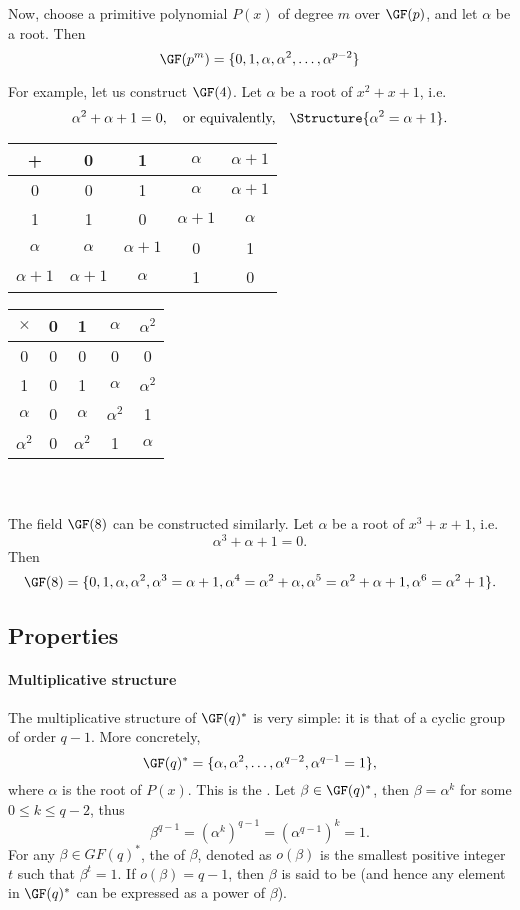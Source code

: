 \documentclass[a4paper, 11pt, openany]{book}
\begin{document}
Now, choose a primitive polynomial $P(x)$ of degree $m$ over $\GF(p)$, and let $\alpha$ be a root. Then
\[
    \GF(p^m) = \{ 0, 1, \alpha, \alpha^2, \dots, \alpha^{p-2} \}
\]



For example, let us construct $\GF(4)$. Let $\alpha$ be a root of $x^2 + x + 1$, i.e.
\[
	\alpha^2 + \alpha + 1 = 0, \quad \mbox{or equivalently,} \quad \Structure{\alpha^2 = \alpha+1}.
\]


\begin{tabular}{c|c|c|c|c|}
	+ & 0 & 1 & $\alpha$ & $\alpha+1$\\
	\hline
	0 & 0 & 1 & $\alpha$ & $\alpha+1$\\
	\hline
	1 & 1 & 0 & $\alpha+1$ & $\alpha$\\
	\hline
	$\alpha$ & $\alpha$ & $\alpha+1$ & 0 & 1\\
	\hline
	$\alpha+1$ & $\alpha+1$ & $\alpha$ & 1 & 0\\
	\hline
\end{tabular}
\hfill
\begin{tabular}{c|c|c|c|c|}
	$\times$ & 0 & 1 & $\alpha$ & $\alpha^2$\\
	\hline
	0 & 0 & 0 & 0 & 0\\
	\hline
	1 & 0 & 1 & $\alpha$ & $\alpha^2$\\
	\hline
	$\alpha$ & 0 & $\alpha$ & $\alpha^2$ & 1\\
	\hline
	$\alpha^2$ & 0 & $\alpha^2$ & 1 & $\alpha$\\
	\hline
\end{tabular}
~\\
~\\
The field $\GF(8)$ can be constructed similarly. Let $\alpha$ be a root of $x^3 + x + 1$, i.e.
\[
	\alpha^3 + \alpha + 1 = 0.
\]
Then
\[
    \GF(8) = \{0,1,\alpha,\alpha^2,\alpha^3  = \alpha+1, \alpha^4 = \alpha^2 + \alpha, \alpha^5 = \alpha^2 + \alpha + 1, \alpha^6 = \alpha^2 + 1\}.
\]


\subsection{Properties}

\paragraph{Multiplicative structure}
The multiplicative structure of $\GF(q)^*$ is very simple: it is that of a cyclic group of order $q-1$. More concretely,
\[
    \GF(q)^* = \{\alpha, \alpha^2, \dots, \alpha^{q-2}, \alpha^{q-1} = 1\},
\]
where $\alpha$ is the root of $P(x)$. This is the . Let $\beta \in \GF(q)^*$, then $\beta = \alpha^k$ for some $0 \le k \le q-2$, thus
\[
    \beta^{q-1} = \left( \alpha^k \right)^{q-1} = \left( \alpha^{q-1} \right)^k = 1.
\]
For any $\beta \in GF(q)^*$, the  of $\beta$, denoted as $o(\beta)$ is the smallest positive integer $t$ such that $\beta^t = 1$. If $o(\beta) = q-1$, then $\beta$ is said to be  (and hence any element in $\GF(q)^*$ can be expressed as a power of $\beta$).
\end{document}
